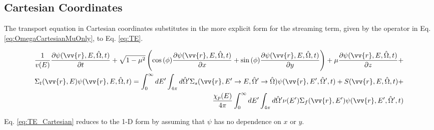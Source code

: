 \documentclass[10pt]{article}
\newcommand{\beqa}{\begin{equation}\begin{aligned}}
\newcommand{\eeqa}{\end{aligned}\end{equation}}
\newcommand{\hO}{\hat{\Omega}}
\newcommand{\spa}{(\vv{r}, E, \hO, t)}
\newcommand{\spas}{(\vv{r},E,t)}
\newcommand{\spap}{(\vv{r}, E', \hO',t)}
\begin{document}
\begin{flushleft}

\subsection{Cartesian Coordinates}

The transport equation in Cartesian coordinates substitutes in the more explicit form for the streaming term, given by the operator in Eq. \ref{eq:OmegaCartesianMuOnly}, to Eq. \ref{eq:TE}. 

\begin{equation}
\label{eq:TE_Cartesian}
\begin{aligned}
\frac{1}{v(E)} \frac{\partial\psi\spa }{\partial t} +
 \sqrt{1-\mu^2}\left(\cos{(\phi)}\frac{\partial \psi\spa }{\partial x} + \sin{(\phi)} \frac{\partial \psi\spa }{\partial y}\right) + \mu \frac{\partial \psi\spa }{\partial z} +\\
 \Sigma_t(\vv{r},E)\psi\spa  = \int_{0}^{\infty}dE' \int_{4\pi}^{ } d\hO  ' \Sigma_s(\vv{r}, E'\rightarrow E, \hO  '\rightarrow\hO  )\psi\spap + S\spa +\\
 \frac{\chi_p(E)}{4\pi} \int_{0}^{\infty} dE'\int_{4\pi}^{} d\hO  '\nu(E')\Sigma_f(\vv{r}, E')\psi\spap\\
\end{aligned}
\end{equation}

Eq. \ref{eq:TE_Cartesian} reduces to the 1-D form by assuming that \(\psi\) has no dependence on \(x\) or \(y\). 


\end{flushleft}
\end{document}

